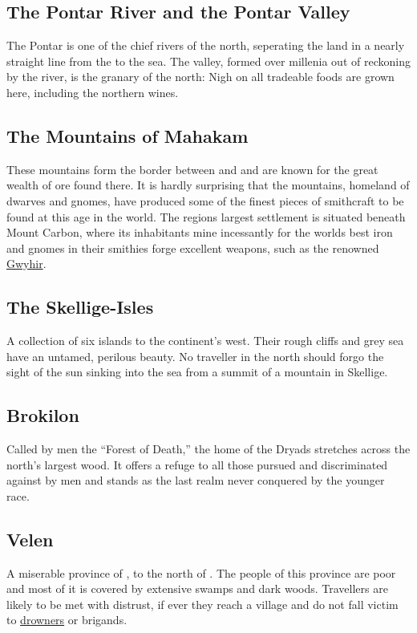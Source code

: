 \documentclass[parskip=full,11pt,%
footheight=38pt]{scrreport}
\begin{document}
\subsection{The Pontar River and the Pontar Valley}\label{region:pontar}
The Pontar is one of the chief rivers of the north, seperating the land in a nearly straight line from the  to the sea.
The valley, formed over millenia out of reckoning by the river, is the granary of the north: Nigh on all tradeable foods are grown here,
including the northern wines.

\subsection{The Mountains of Mahakam}\label{region:mahakamMtns}
These mountains form the border between  and  and are known for the great wealth
of ore found there. It is hardly surprising that the mountains, homeland of dwarves and gnomes, have produced some of the finest
pieces of smithcraft to be found at this age in the world. The regions largest settlement is situated beneath Mount Carbon,
where its inhabitants mine incessantly for the worlds best iron and gnomes in their smithies forge excellent weapons, such as
the renowned \hyperref[weapon:gwyhir]{Gwyhir}.

\subsection{The Skellige-Isles}\label{region:skellige}
A collection of six islands to the continent's west. Their rough cliffs and grey sea have an untamed, perilous beauty.
No traveller in the north should forgo the sight of the sun sinking into the sea from a summit of a mountain in Skellige.

\subsection{Brokilon}\label{region:brokilon}
Called by men the ``Forest of Death,'' the home of the Dryads stretches across the north's largest wood. It offers a refuge to
all those pursued and discriminated against by men and stands as the last realm never conquered by the younger race.

\subsection{Velen}\label{region:velen}
A miserable province of , to the north of . The people of this
province are poor and most of it is covered by extensive swamps and dark woods. Travellers are likely to be met
with distrust, if ever they reach a village and do not fall victim to \hyperref[monster:drowner]{drowners} or 
brigands.
\end{document}
